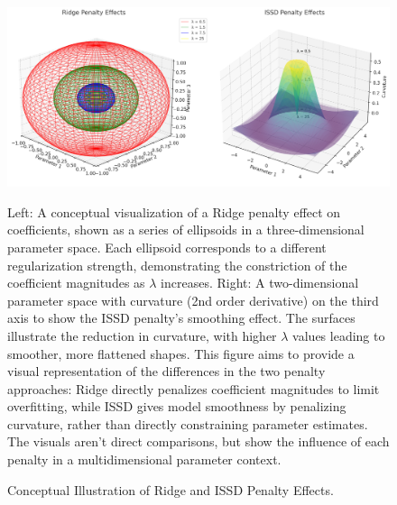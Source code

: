 \documentclass[12pt, twoside,hidelinks]{article}
\theoremstyle{definition}
\numberwithin{equation}{section}
\begin{document}
\begin{figure}[H]
    \centering
    \includegraphics[width=\textwidth]{visuals/Theory/ridge_vs_issd_plot_nice.png}
    \caption{Conceptual Illustration of Ridge and ISSD Penalty Effects.}{Left: A conceptual visualization of a Ridge penalty effect on coefficients, shown as a series of ellipsoids in a three-dimensional parameter space. Each ellipsoid corresponds to a different regularization strength, demonstrating the constriction of the coefficient magnitudes as \(\lambda\) increases. Right: A two-dimensional parameter space with curvature (2nd order derivative) on the third axis to show the ISSD penalty's smoothing effect. The surfaces illustrate the reduction in curvature, with higher \(\lambda\) values leading to smoother, more flattened shapes. This figure aims to provide a visual representation of the differences in the two penalty approaches: Ridge directly penalizes coefficient magnitudes to limit overfitting, while ISSD gives model smoothness by penalizing curvature, rather than directly constraining parameter estimates. The visuals aren't direct comparisons, but show the influence of each penalty in a multidimensional parameter context.}
    \label{fig:ridge_vs_issd}
\end{figure}
\end{document}
